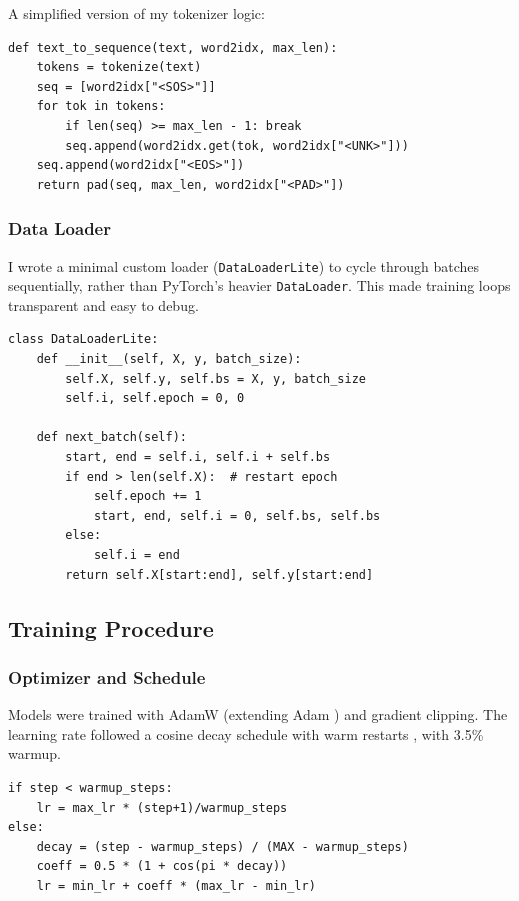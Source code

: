 \documentclass[11pt, oneside]{article}   	%
\begin{document}
A simplified version of my tokenizer logic:  
\begin{verbatim}
def text_to_sequence(text, word2idx, max_len):
    tokens = tokenize(text)
    seq = [word2idx["<SOS>"]]
    for tok in tokens:
        if len(seq) >= max_len - 1: break
        seq.append(word2idx.get(tok, word2idx["<UNK>"]))
    seq.append(word2idx["<EOS>"])
    return pad(seq, max_len, word2idx["<PAD>"])
\end{verbatim}

\subsubsection{Data Loader}  
I wrote a minimal custom loader (\texttt{DataLoaderLite}) to cycle through batches sequentially, rather than PyTorch’s heavier \texttt{DataLoader}. This made training loops transparent and easy to debug.

\begin{verbatim}
class DataLoaderLite:
    def __init__(self, X, y, batch_size):
        self.X, self.y, self.bs = X, y, batch_size
        self.i, self.epoch = 0, 0

    def next_batch(self):
        start, end = self.i, self.i + self.bs
        if end > len(self.X):  # restart epoch
            self.epoch += 1
            start, end, self.i = 0, self.bs, self.bs
        else:
            self.i = end
        return self.X[start:end], self.y[start:end]
\end{verbatim}

\subsection{Training Procedure}

\subsubsection{Optimizer and Schedule}  
Models were trained with AdamW \cite{loshchilov2019decoupled} (extending Adam \cite{kingma2015adam}) and gradient clipping. The learning rate followed a cosine decay schedule with warm restarts \cite{loshchilov2016sgdr}, with 3.5\% warmup.



\begin{verbatim}
if step < warmup_steps:
    lr = max_lr * (step+1)/warmup_steps
else:
    decay = (step - warmup_steps) / (MAX - warmup_steps)
    coeff = 0.5 * (1 + cos(pi * decay))
    lr = min_lr + coeff * (max_lr - min_lr)
\end{verbatim}
\end{document}
